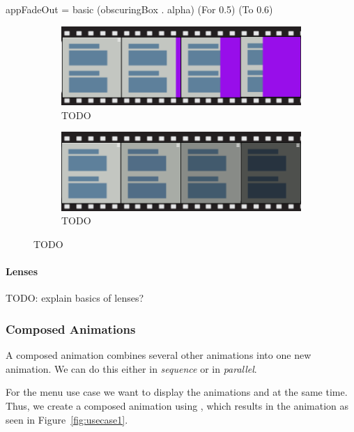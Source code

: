 \begin{spec}
appFadeOut = basic (obscuringBox . alpha) (For 0.5) (To 0.6)
\end{spec}

\begin{figure}[H]
\centering

\begin{subfigure}[h]{0.75\textwidth}
\centering
\includegraphics[scale=0.4]{pictures/usecase1basic1.png}
\caption{TODO}
\label{fig:usecase1basic1}
\end{subfigure}

\begin{subfigure}[h]{0.75\textwidth}
\centering
\includegraphics[scale=0.4]{pictures/usecase1basic2.png}
\caption{TODO}
\label{fig:usecase1basic2}
\end{subfigure}

\caption{TODO}
\label{fig:usecase1basic}
\end{figure}

\paragraph{Lenses} TODO: explain basics of lenses?

\subsubsection{Composed Animations}

A composed animation combines several other animations into one new animation. We can do this either in \emph{sequence} or in \emph{parallel}.

For the menu use case we want to display the animations  and  at the same time. Thus, we create a composed animation using ,  which results in the animation as seen in Figure~\ref{fig:usecase1}.

